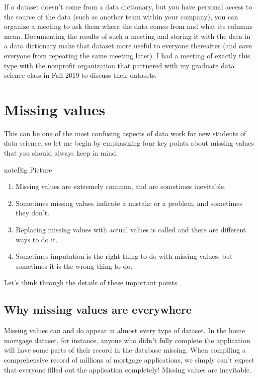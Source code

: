 \documentclass[letterpaper,10pt,english]{sphinxmanual}
\begin{document}
If a dataset doesn’t come from a data dictionary, but you have personal access to the source of the data (such as another team within your company), you can organize a meeting to ask them where the data comes from and what its columns mean.  Documenting the results of such a meeting and storing it with the data in a data dictionary make that dataset more useful to everyone thereafter (and save everyone from repeating the same meeting later).  I had a meeting of exactly this type with the nonprofit organization that partnered with my graduate data science class in Fall 2019 to discuss their datasets.


\section{Missing values}
\label{\detokenize{chapter-13-etl:missing-values}}
This can be one of the most confusing aspects of data work for new students of data science, so let me begin by emphasizing four key points about missing values that you should always keep in mind.

\begin{sphinxadmonition}{note}{Big Picture}
\begin{enumerate}
%
\item {} 
Missing values are extremely common, and are sometimes inevitable.

\item {} 
Sometimes missing values indicate a mistake or a problem, and sometimes they don’t.

\item {} 
Replacing missing values with actual values is called  and there are  different ways to do it.

\item {} 
Sometimes imputation is the right thing to do with missing values, but sometimes it is the wrong thing to do.

\end{enumerate}
\end{sphinxadmonition}

Let’s think through the details of these important points.


\subsection{Why missing values are everywhere}
\label{\detokenize{chapter-13-etl:why-missing-values-are-everywhere}}
Missing values can and do appear in almost every type of dataset.  In the home mortgage dataset, for instance, anyone who didn’t fully complete the application will have some parts of their record in the database missing.  When compiling a comprehensive record of millions of mortgage applications, we simply can’t expect that everyone filled out the application completely!  Missing values are inevitable.
\end{document}
